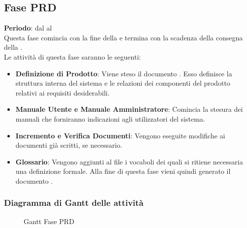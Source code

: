 \subsection{Fase PRD}
	\textbf{Periodo}: dal  al  \\Questa fase comincia con la fine della  e termina con la scadenza della consegna della .\\Le attività di questa fase saranno le seguenti:
	\begin{itemize}
		\item\textbf{Definizione di Prodotto}: Viene steso il documento . Esso definisce la struttura interna del sistema e le relazioni dei componenti del prodotto relativi ai requisiti desiderabili.
		\item\textbf{Manuale Utente e Manuale Amministratore}: Comincia la stesura dei manuali che forniranno indicazioni agli utilizzatori del sistema.
		\item\textbf{Incremento e Verifica Documenti}: Vengono eseguite modifiche ai documenti già scritti, se necessario.
		\item\textbf{Glossario}: Vengono aggiunti al file  i vocaboli dei quali si ritiene necessaria una definizione formale. Alla fine di questa fase vieni quindi generato il documento .
	\end{itemize}
	\subsubsection{Diagramma di Gantt delle attività}
	\begin{figure}\centering
	\caption{Gantt Fase PRD}
\end{figure}